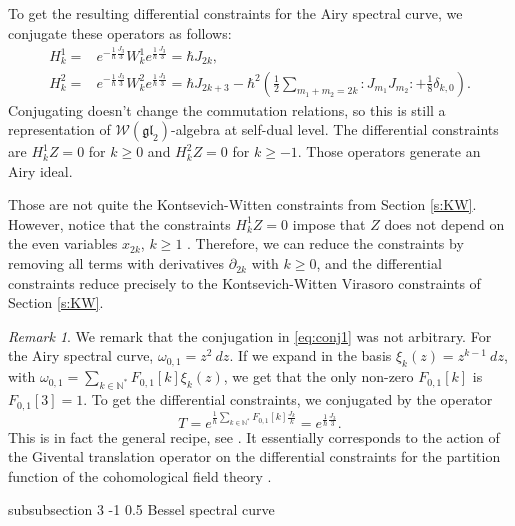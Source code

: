 \documentclass[reqno,oneside,11pt]{amsart}
\makeatletter
\theoremstyle{plain}
\theoremstyle{definition}
\theoremstyle{remark}
\newtheorem{remark}[theorem]{Remark}
\numberwithin{equation}{section}
\renewcommand{\subsubsection}{\@startsection
{subsubsection}%
{3}%
{\z@}%
{-1\baselineskip}%
{0.5\baselineskip}%
{\normalfont \it \normalsize}} %
\makeatother
\begin{document}
To get the resulting differential constraints for the Airy spectral curve, we conjugate these operators as follows:
\begin{align}\label{eq:conj1}
H^1_k =& e^{-\frac{1}{\hbar} \frac{J_3}{3}} W^1_k e^{\frac{1}{\hbar} \frac{J_3}{3}} = \hbar J_{2k},\nonumber\\
H^2_k =& e^{-\frac{1}{\hbar} \frac{J_3}{3}} W^2_k e^{\frac{1}{\hbar} \frac{J_3}{3}} = \hbar J_{2k+3}- \hbar^2 \left( \frac{1}{2}\sum_{m_1+m_2 =2 k} : J_{m_1} J_{m_2}: + \frac{1}{8}\delta_{k,0} \right).
\end{align}
Conjugating doesn't change the commutation relations, so this is still a representation of $\mathcal{W}(\mathfrak{gl}_2)$-algebra at self-dual level. The differential constraints are $H^1_k Z = 0$ for $k \geq 0$ and $H^2_k Z = 0$ for $k \geq -1$. Those operators generate an Airy ideal. 

Those are not quite the Kontsevich-Witten constraints from Section \ref{s:KW}. However, notice that the constraints $H^1_k Z = 0$ impose that $Z$ does not depend on the even variables $x_{2k}$, $k \geq 1$ . Therefore, we can reduce the constraints by removing all terms with derivatives $\partial_{2k}$ with $k \geq 0$, and the differential constraints reduce precisely to the Kontsevich-Witten Virasoro constraints of Section \ref{s:KW}.

\begin{remark}
We remark that the conjugation in \eqref{eq:conj1} was not arbitrary.  For the Airy spectral curve, $\omega_{0,1} = z^2\ dz$. If we expand in the basis $\xi_k(z) = z^{k-1}\ dz$, with $\omega_{0,1} = \sum_{ k \in \mathbb{N}^*} F_{0,1}[k] \xi_k(z)$, we get that the only non-zero $F_{0,1}[k]$ is $F_{0,1}[3] = 1$. To get the differential constraints, we conjugated by the operator
\begin{equation}
T = e^{\frac{1}{\hbar} \sum_{k \in \mathbb{N}^*} F_{0,1}[k] \frac{J_k}{k}} = e^{\frac{1}{\hbar} \frac{J_3}{3} }.
\end{equation}
This is in fact the general recipe, see \cite{BBCCN18}. It essentially corresponds to the action of the Givental translation operator on the differential constraints for the partition function of the cohomological field theory .
\end{remark}

\subsubsection{Bessel spectral curve}
\end{document}
